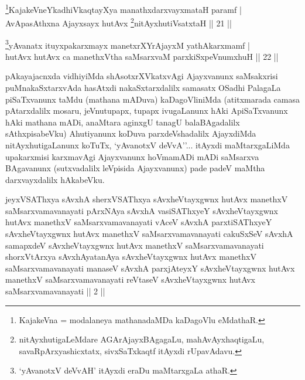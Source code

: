 \begin{shl}
\footnote{KajakeVna = modalaneya mathanadaMDa kaDagoVlu eMdathaR.}KajakeVneYkadhiVkaqtayXya manathxdarxvayxmataH paramf | \\
AvApasAthxna Ajayxsayx hutAvx \footnote{nitAyxhutigaLeMdare AGArAjayxBAgagaLu, mahAvAyxhaqtigaLu, savaRpArxyashicxtatx, sivxSaTxkaqtf itAyxdi rUpavAdavu.}nitAyxhutiVsatxtaH \hfill|| 21 || 
\end{shl}



\begin{shl}
\footnote{`yAvanotxV deVvAH' itAyxdi eraDu maMtarxgaLa athaR.}yAvanatx ituyxpakarxmayx manetxrXYrAjayxM yathAkarxmamf | \\
hutAvx hutAvx ca manethxV\s tha saMsarxvaM parxkiSxpeVnumxhuH \hfill|| 22 || 
\end{shl}

\begin{artha}
pAkayajacnxda vidhiyiMda shAsotxrXVkatxvAgi Ajayxvanunx saMsakxrisi puMnakaSxtarxvAda hasAtxdi nakaSxtarxdalilx samasatx OSadhi PalagaLa piSaTxvanunx taMdu (mathana mADuva) kaDagoVliniMda (atitxmarada camasa pAtarxdalilx mosaru, jeVnutupapx, tupapx ivugaLanunx hAki ApiSaTxvanunx hAki mathana mADi, anaMtara aginxgU tanagU balaBAgadalilx sAthxpisabeVku) Ahutiyanunx koDuva parxdeVshadalilx AjayxdiMda nitAyxhutigaLanunx koTuTx, `yAvanotxV deVvA''... itAyxdi maMtarxgaLiMda upakarxmisi karxmavAgi Ajayxvanunx hoVmamADi mADi saMsarxva BAgavanunx (sutxvadalilx leVpisida Ajayxvanunx) pade padeV maMtha darxvayxdalilx hAkabeVku.
\end{artha}

\begin{kandikeshl}
jeyxVSAThxya sAvxhA sherxVSAThxya sAvxheVtayxgwnx hutAvx manethxV saMsarxvamavanayati pArxNAya sAvxhA vasiSAThxyeY sAvxheVtayxgwnx hutAvx manethxV saMsarxvamavanayati vAceV sAvxhA parxtiSAThxyeY sAvxheVtayxgwnx hutAvx manethxV saMsarxvamavanayati cakuSxSeV sAvxhA samapxdeV sAvxheVtayxgwnx hutAvx manethxV saMsarxvamavanayati shorxVtArxya sAvxhAyatanAya sAvxheVtayxgwnx hutAvx manethxV saMsarxvamavanayati manaseV sAvxhA parxjAteyxY sAvxheVtayxgwnx hutAvx manethxV saMsarxvamavanayati reVtaseV sAvxheVtayxgwnx hutAvx saMsarxvamavanayati || 2 ||
\end{kandikeshl}

